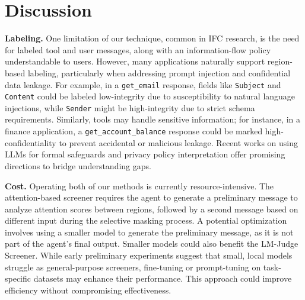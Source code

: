 \section{Discussion} \label{sec:discussion}

\textbf{Labeling.} One limitation of our technique, common in IFC research, is the need for labeled tool and user messages, along with an information-flow policy understandable to users. However, many applications naturally support region-based labeling, particularly when addressing prompt injection and confidential data leakage. For example, in a \texttt{get\_email} response, fields like \texttt{Subject} and \texttt{Content} could be labeled low-integrity due to susceptibility to natural language injections, while \texttt{Sender} might be high-integrity due to strict schema requirements. Similarly, tools may handle sensitive information; for instance, in a finance application, a \texttt{get\_account\_balance} response could be marked high-confidentiality to prevent accidental or malicious leakage. Recent works on using LLMs for formal safeguards \cite{barth2024automated_reasoning} and privacy policy interpretation \cite{chen2024clearcontextualllmempoweredprivacy, tang2023policygptautomatedanalysisprivacy} offer promising directions to bridge understanding gaps.

\textbf{Cost.} Operating both of our \dependencydetector methods is currently resource-intensive. The attention-based screener requires the agent to generate a preliminary message to analyze attention scores between regions, followed by a second message based on different input during the selective masking process. A potential optimization involves using a smaller model to generate the preliminary message, as it is not part of the agent’s final output.  Smaller models could also benefit the LM-Judge Screener. While early preliminary experiments suggest that small, local models struggle as general-purpose screeners, fine-tuning or prompt-tuning \cite{opsahlong2024optimizinginstructionsdemonstrationsmultistage} on task-specific datasets may enhance their performance. This approach could improve efficiency without compromising effectiveness.
